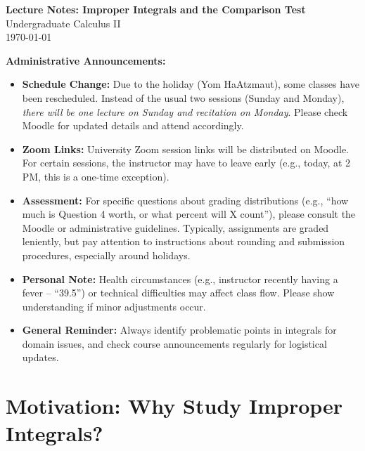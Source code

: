 \documentclass[12pt]{article}
\newenvironment{administrative_note}
  {\begin{leftbar}\color{AdminBlue}\small\ignorespaces}
  {\end{leftbar}\ignorespacesafterend}
\begin{document}
\begin{center}
    {\LARGE \textbf{Lecture Notes: Improper Integrals and the Comparison Test}}\\[1em]
    {\large Undergraduate Calculus II}\\
    \vspace{1em}
    \today
\end{center}

\vspace{0.5em}

\begin{administrative_note}
\textbf{Administrative Announcements:}
\begin{itemize}
    \item \textbf{Schedule Change:} Due to the holiday (Yom HaAtzmaut), some classes have been rescheduled. Instead of the usual two sessions (Sunday and Monday), \emph{there will be one lecture on Sunday and recitation on Monday}. Please check Moodle for updated details and attend accordingly.
    \item \textbf{Zoom Links:} University Zoom session links will be distributed on Moodle. For certain sessions, the instructor may have to leave early (e.g., today, at 2 PM, this is a one-time exception).
    \item \textbf{Assessment:} For specific questions about grading distributions (e.g., “how much is Question 4 worth, or what percent will X count”), please consult the Moodle or administrative guidelines. Typically, assignments are graded leniently, but pay attention to instructions about rounding and submission procedures, especially around holidays.
    \item \textbf{Personal Note:} Health circumstances (e.g., instructor recently having a fever -- “39.5”) or technical difficulties may affect class flow. Please show understanding if minor adjustments occur.
    \item \textbf{General Reminder:} Always identify problematic points in integrals for domain issues, and check course announcements regularly for logistical updates.
\end{itemize}
\end{administrative_note}


\section{Motivation: Why Study Improper Integrals?}
\end{document}
